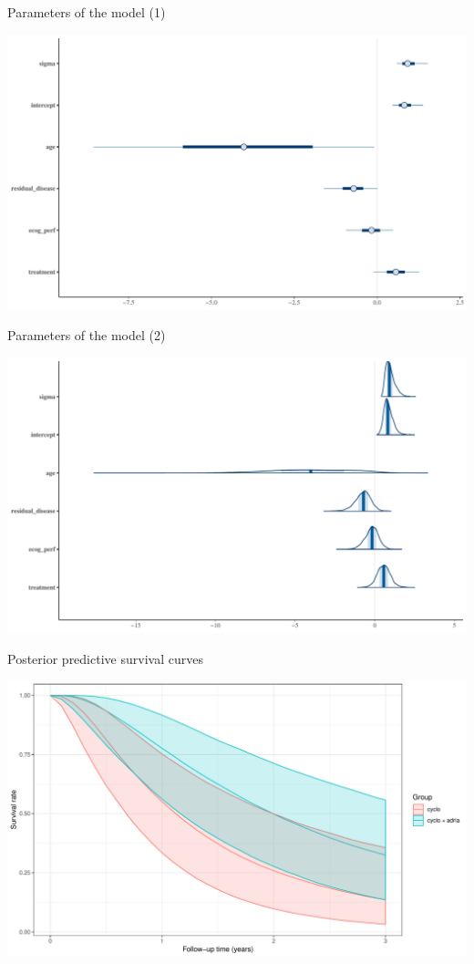\documentclass[ignorenonframetext,a4paper]{beamer}
\begin{document}
\begin{frame}{Parameters of the model (1)}

\includegraphics{DB_presentation_case_study_files/figure-beamer/unnamed-chunk-24-1.pdf}

\end{frame}

\begin{frame}{Parameters of the model (2)}

\includegraphics{DB_presentation_case_study_files/figure-beamer/unnamed-chunk-25-1.pdf}

\end{frame}

\begin{frame}{Posterior predictive survival curves}

\includegraphics{DB_presentation_case_study_files/figure-beamer/unnamed-chunk-26-1.pdf}

\end{frame}
\end{document}

